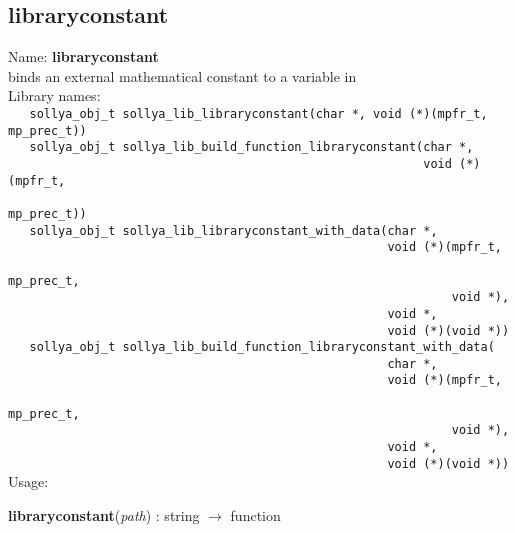 \subsection{libraryconstant}
\label{lablibraryconstant}
\noindent Name: \textbf{libraryconstant}\\
\phantom{aaa}binds an external mathematical constant to a variable in \sollya\\[0.2cm]
\noindent Library names:\\
\verb|   sollya_obj_t sollya_lib_libraryconstant(char *, void (*)(mpfr_t, mp_prec_t))|\\
\verb|   sollya_obj_t sollya_lib_build_function_libraryconstant(char *,|\\
\verb|                                                          void (*)(mpfr_t,|\\
\verb|                                                                   mp_prec_t))|\\
\verb|   sollya_obj_t sollya_lib_libraryconstant_with_data(char *,|\\
\verb|                                                     void (*)(mpfr_t,|\\
\verb|                                                              mp_prec_t,|\\
\verb|                                                              void *),|\\
\verb|                                                     void *,|\\
\verb|                                                     void (*)(void *))|\\
\verb|   sollya_obj_t sollya_lib_build_function_libraryconstant_with_data(|\\
\verb|                                                     char *,|\\
\verb|                                                     void (*)(mpfr_t,|\\
\verb|                                                              mp_prec_t,|\\
\verb|                                                              void *),|\\
\verb|                                                     void *,|\\
\verb|                                                     void (*)(void *))|\\[0.2cm]
\noindent Usage: 
\begin{center}
\textbf{libraryconstant}(\emph{path}) : \textsf{string} $\rightarrow$ \textsf{function}\\
\end{center}
